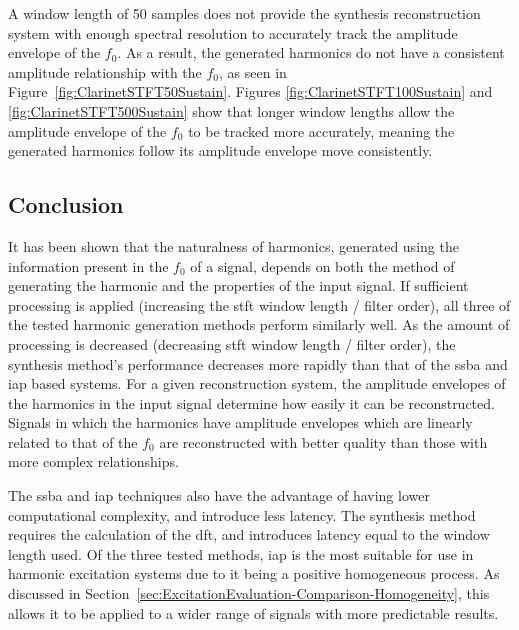 		A window length of 50 samples does not provide the synthesis reconstruction system with enough spectral
		resolution to accurately track the amplitude envelope of the $f_{0}$. As a result, the generated harmonics
		do not have a consistent amplitude relationship with the $f_{0}$, as seen in
		Figure~\ref{fig:ClarinetSTFT50Sustain}. Figures \ref{fig:ClarinetSTFT100Sustain} and
		\ref{fig:ClarinetSTFT500Sustain} show that longer window lengths allow the amplitude envelope of the
		$f_{0}$ to be tracked more accurately, meaning the generated harmonics follow its amplitude envelope move
		consistently.
		
	\subsection{Conclusion}
	\label{sec:PerceptualExperiments-Reconstruction-Conclusion}
		It has been shown that the naturalness of harmonics, generated using the information present in the $f_{0}$
		of a signal, depends on both the method of generating the harmonic and the properties of the input signal.
		If sufficient processing is applied (increasing the \acrshort{stft} window length / filter order), all
		three of the tested harmonic generation methods perform similarly well. As the amount of processing is
		decreased (decreasing \acrshort{stft} window length / filter order), the synthesis method's performance
		decreases more rapidly than that of the \acrshort{ssba} and \acrshort{iap} based systems. For a given
		reconstruction system, the amplitude envelopes of the harmonics in the input signal determine how easily it
		can be reconstructed.  Signals in which the harmonics have amplitude envelopes which are linearly related
		to that of the $f_{0}$ are reconstructed with better quality than those with more complex relationships.
		
		The \acrshort{ssba} and \acrshort{iap} techniques also have the advantage of having lower computational
		complexity, and introduce less latency. The synthesis method requires the calculation of the
		\acrshort{dft}, and introduces latency equal to the window length used. Of the three tested methods,
		\acrshort{iap} is the most suitable for use in harmonic excitation systems due to it being a positive
		homogeneous process. As discussed in Section~\ref{sec:ExcitationEvaluation-Comparison-Homogeneity}, this
		allows it to be applied to a wider range of signals with more predictable results.

